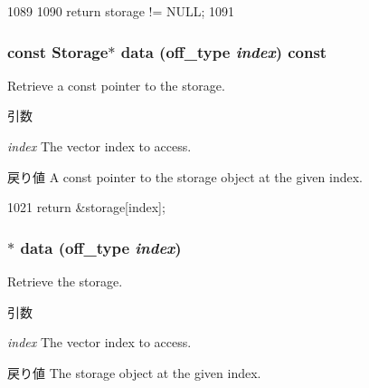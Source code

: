 \begin{DoxyCode}
1089     {
1090         return storage != NULL;
1091     }
\end{DoxyCode}
\hypertarget{classStats_1_1VectorBase_a53a38df6a99d518a4016d9635235cc44}{
\subsubsection[{data}]{\setlength{\rightskip}{0pt plus 5cm}const {\bf Storage}$\ast$ data ({\bf off\_\-type} {\em index}) const}}
\label{classStats_1_1VectorBase_a53a38df6a99d518a4016d9635235cc44}
Retrieve a const pointer to the storage. 
\begin{DoxyParams}{引数}
\item[{\em index}]The vector index to access. \end{DoxyParams}
\begin{DoxyReturn}{戻り値}
A const pointer to the storage object at the given index. 
\end{DoxyReturn}



\begin{DoxyCode}
1021 { return &storage[index]; }
\end{DoxyCode}
\hypertarget{classStats_1_1VectorBase_ad9077db0c8f34051d2e7766c947aa7b2}{
\subsubsection[{data}]{$\ast$ data ({\bf off\_\-type} {\em index})}}
\label{classStats_1_1VectorBase_ad9077db0c8f34051d2e7766c947aa7b2}
Retrieve the storage. 
\begin{DoxyParams}{引数}
\item[{\em index}]The vector index to access. \end{DoxyParams}
\begin{DoxyReturn}{戻り値}
The storage object at the given index. 
\end{DoxyReturn}



